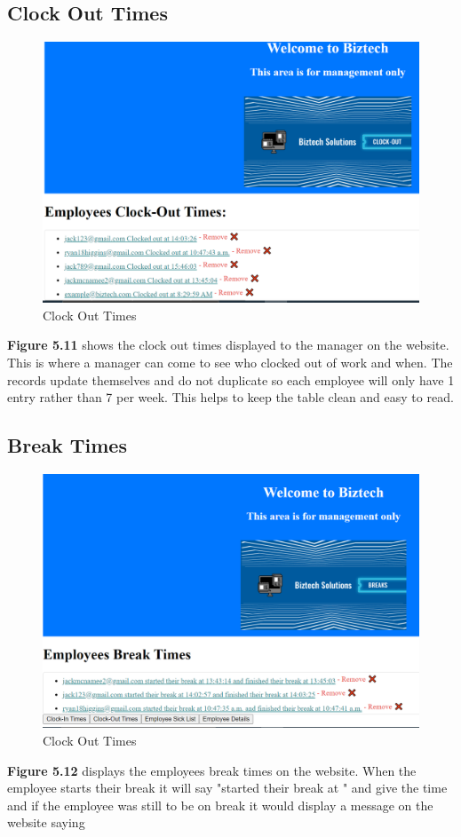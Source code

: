 \subsection{Clock Out Times}
\begin{figure}[!htb]
    \centering
    \includegraphics[scale=0.66]{img/ClockOutTimes.PNG}
    \caption{Clock Out Times}
    \label{fig}
\end{figure}
\textbf{Figure 5.11} shows the clock out times displayed to the manager on the website. This is where a manager can come to see who clocked out of work and when. The records update themselves and do not duplicate so each employee will only have 1 entry rather than 7 per week. This helps to keep the table clean and easy to read.
\FloatBarrier


\subsection{Break Times}
\begin{figure}[!htb]
    \centering
    \includegraphics[scale=0.66]{img/BreakTimes.PNG}
    \caption{Clock Out Times}
    \label{fig}
\end{figure}
\textbf{Figure 5.12} displays the employees break times on the website. When the employee starts their break it will say "started their break at " and give the time and if the employee was still to be on break it would display a message on the website saying 
\FloatBarrier

